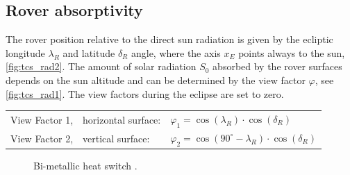 \subsection{Rover absorptivity} \label{sec:app_therm_4}
The rover position relative to the direct sun radiation is given by the ecliptic longitude $\lambda_R$ and latitude $\delta_R$ angle, where the axis $x_E$ points always to the sun, \autoref{fig:tcs_rad2}.
The amount of solar radiation $S_0$ absorbed by the rover surfaces depends on the sun altitude and can be determined by the view factor $\varphi$, see \autoref{fig:tcs_rad1}.
The view factors during the eclipse are set to zero.

\begin{table}[H]
	\begin{tabular}{l@{\qquad}ll}
		View Factor 1,& horizontal surface:& $ \varphi_1=\cos (\lambda_R) \cdot \cos (\delta_R)  $ \\
		View Factor 2, & vertical surface: &$ \varphi_2=\cos (90^{\circ}-\lambda_R) \cdot \cos (\delta_R)  $\\
	\end{tabular}
\end{table}

\begin{figure}[h]
	\centering
	\qquad\qquad
	\caption{Bi-metallic heat switch \cite{ref_tcs_04}.}
	\label{fig:tcs_rad}
\end{figure}


